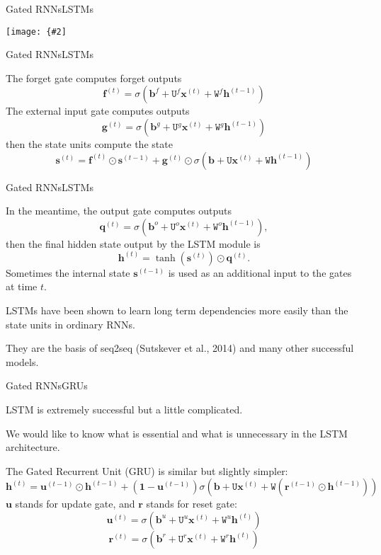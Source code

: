 \documentclass{beamer}
\renewcommand{\vec}[1]{\boldsymbol{#1}}
\newcommand{\mat}[1]{\mathtt{#1}}
\newcommand{\myfig}[3]{\centerline{\texttt{[image: \{\#2]}}}
    \centerline{\scriptsize #3}}
\begin{document}
\begin{frame}{Gated RNNs}{LSTMs}

  \myfig{2in}{goodfellow-fig10-16}{Goodfellow, Bengio, and Courville
    (2016), Fig.\ 10.16}
  
\end{frame}


\begin{frame}{Gated RNNs}{LSTMs}

  The \alert{forget gate} computes forget outputs
  \[ \vec{f}^{(t)} = \sigma\left( \vec{b}^f + \mat{U}^f\vec{x}^{(t)}
  + \mat{W}^f\vec{h}^{(t-1)} \right) \]
  The \alert{external input gate} computes outputs
  \[ \vec{g}^{(t)} = \sigma\left( \vec{b}^g + \mat{U}^g\vec{x}^{(t)}
  + \mat{W}^g\vec{h}^{(t-1)} \right) \]
  then the \alert{state units} compute the state
  \[ \vec{s}^{(t)} = \vec{f}^{(t)}\odot\vec{s}^{(t-1)} + \vec{g}^{(t)}\odot
  \sigma\left( \vec{b} + \mat{U}\vec{x}^{(t)} + \mat{W}\vec{h}^{(t-1)}
  \right) \]

\end{frame}


\begin{frame}{Gated RNNs}{LSTMs}

  In the meantime, the \alert{output gate} computes outputs
  \[ \vec{q}^{(t)} = \sigma\left( \vec{b}^o + \mat{U}^o\vec{x}^{(t)}
  + \mat{W}^o \vec{h}^{(t-1)} \right), \]
  then the final \alert{hidden state} output by the LSTM module is
  \[ \vec{h}^{(t)} = \tanh\left( \vec{s}^{(t)} \right) \odot \vec{q}^{(t)} .\]
  Sometimes the internal state $\vec{s}^{(t-1)}$ is used as an additional input
  to the gates at time $t$.

  \medskip

  LSTMs have been shown to learn long term dependencies more easily
  than the state units in ordinary RNNs.

  \medskip
  
  They are the basis of \alert{seq2seq}
  (Sutskever et al., 2014) and many other successful models.
  
\end{frame}


\begin{frame}{Gated RNNs}{GRUs}

  LSTM is extremely successful but a little complicated.

  \medskip

  We would like to know what is essential and what is unnecessary in the
  LSTM architecture.

  \medskip

  The \alert{Gated Recurrent Unit (GRU)} is similar but slightly simpler:
  \[ \vec{h}^{(t)} = \vec{u}^{(t-1)} \odot \vec{h}^{(t-1)} +
  (\vec{1}-\vec{u}^{(t-1)}) \sigma\left( \vec{b}
  + \mat{U}\vec{x}^{(t)} + \mat{W}\left(\vec{r}^{(t-1)}\odot \vec{h}^{(t-1)}\right) \right) \]
  $\vec{u}$ stands for \alert{update gate}, and
  $\vec{r}$ stands for \alert{reset gate}:
  \[ \vec{u}^{(t)} = \sigma\left( \vec{b}^u + \mat{U}^u\vec{x}^{(t)} +
  \mat{W}^u\vec{h}^{(t)} \right) \]
  \[ \vec{r}^{(t)} = \sigma\left( \vec{b}^r + \mat{U}^r\vec{x}^{(t)} +
  \mat{W}^r\vec{h}^{(t)} \right) \]
  
\end{frame}
\end{document}

